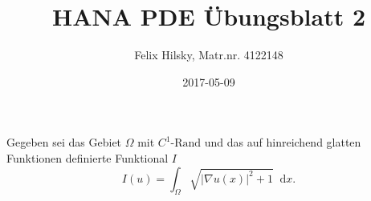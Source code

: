 \documentclass{scrartcl}
\author{Felix Hilsky, Matr.nr. 4122148}
\title{HANA PDE Übungsblatt 2}
\date{2017-05-09}
\newcommand{\abs}[1]{\lvert #1 \rvert}
\newcommand{\intd}{\mathop{} \mathrm{d}}
\begin{document}
  \maketitle


  Gegeben sei das Gebiet
  $\Omega$ mit
  $C^1\text{-Rand}$ und das auf hinreichend glatten Funktionen definierte Funktional $I$
  \begin{equation}
    I(u) = \int_{\Omega}
    \sqrt
    { \abs{ \nabla u (x) } ^ 2 + 1}
    \intd x.
  \end{equation}
\end{document}
